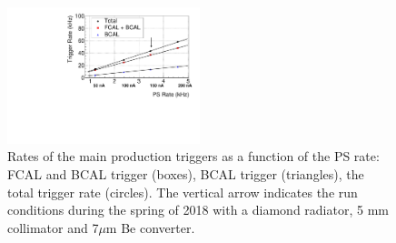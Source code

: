 
\begin{figure}[tbp]
\begin{center}
\includegraphics[width=0.5\textwidth]{figures/plot_triggerL1_c1}  
\caption{Rates of the main production triggers as a function of the PS rate: FCAL and BCAL trigger (boxes), BCAL trigger (triangles), the total trigger rate (circles). The vertical arrow indicates the run conditions during the spring of 2018 with a diamond
radiator, 5 mm collimator and 7$\mu$m Be converter.} \label{fig:trig_rate}
\end{center}
\end{figure}
